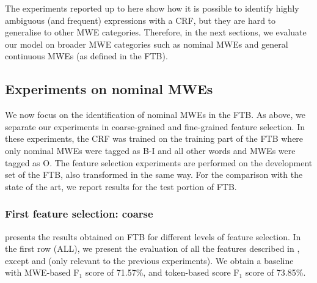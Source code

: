 \documentclass[output=paper,
modfonts
]{langscibook}
\begin{document}
The experiments reported up to here show how it is possible to identify highly ambiguous (and frequent) expressions with a CRF, but they are hard to generalise to other MWE categories. Therefore, in the next sections, we evaluate our model on broader MWE categories such as nominal MWEs and general continuous MWEs (as defined in the FTB).


\subsection{Experiments on nominal MWEs}
\label{schol:sec:results-nominal}

We now focus on the identification of nominal MWEs in the FTB. As above, we separate our experiments in coarse-grained and fine-grained feature selection. In these experiments, the CRF was trained on the training part of the FTB where only nominal MWEs were tagged as B-I and all other words and MWEs were tagged as O. The feature selection experiments are performed on the development set of the FTB, also transformed in the same way. %
For the comparison with the state of the art, we report results for the test portion of FTB.



\subsubsection{First feature selection: coarse}
\label{schol:sec:results-nominal-feat-coarse}
 presents the results obtained on FTB for different levels of feature selection. In the first row (ALL), we present the evaluation of all the features described in , except  and  (only relevant to the previous experiments). We obtain a baseline with MWE-based F$_1$ score of 71.57\%, and token-based score F$_1$ score of 73.85\%. 
\end{document}
